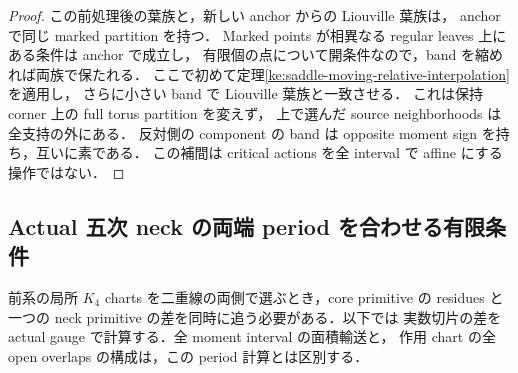 \begin{proof}
この前処理後の葉族と，新しい anchor からの Liouville 葉族は，
anchor で同じ marked partition を持つ．
Marked points が相異なる regular leaves 上にある条件は anchor で成立し，
有限個の点について開条件なので，band を縮めれば両族で保たれる．
ここで初めて定理\ref{ke:saddle-moving-relative-interpolation}を適用し，
さらに小さい band で Liouville 葉族と一致させる．
これは保持 corner 上の full torus partition を変えず，
上で選んだ source neighborhoods は全支持の外にある．
反対側の component の band は opposite moment sign を持ち，互いに素である．
この補間は critical actions を全 interval で affine にする操作ではない．
\end{proof}

\subsection{Actual 五次 neck の両端 period を合わせる有限条件}

前系の局所 $K_4$ charts を二重線の両側で選ぶとき，core primitive の
residues と一つの neck primitive の差を同時に追う必要がある．以下では
実数切片の差を actual gauge で計算する．全 moment interval の面積輸送と，
作用 chart の全 open overlaps の構成は，この period 計算とは区別する．

